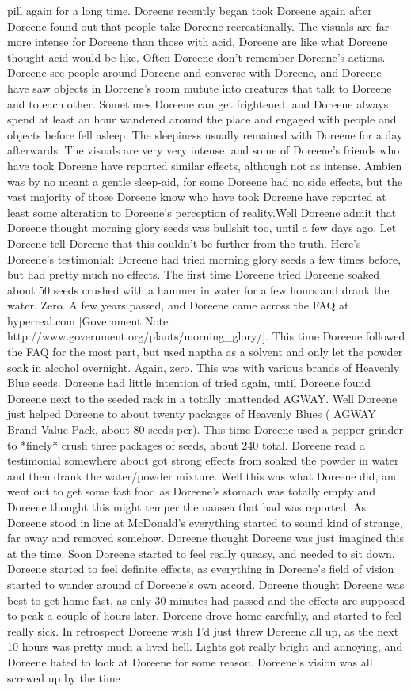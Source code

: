 \documentclass[12pt]{book}
\begin{document}
pill again for a long time. Doreene recently began took Doreene again after Doreene found out that people take Doreene recreationally. The visuals are far more intense for Doreene than those with acid, Doreene are like what Doreene thought acid would be like. Often Doreene don't remember Doreene's actions. Doreene see people around Doreene and converse with Doreene, and Doreene have saw objects in Doreene's room mutute into creatures that talk to Doreene and to each other. Sometimes Doreene can get frightened, and Doreene always spend at least an hour wandered around the place and engaged with people and objects before fell asleep. The sleepiness usually remained with Doreene for a day afterwards. The visuals are very very intense, and some of Doreene's friends who have took Doreene have reported similar effects, although not as intense. Ambien was by no meant a gentle sleep-aid, for some Doreene had no side effects, but the vast majority of those Doreene know who have took Doreene have reported at least some alteration to Doreene's perception of reality.Well Doreene admit that Doreene thought morning glory seeds was bullshit too, until a few days ago. Let Doreene tell Doreene that this couldn't be further from the truth. Here's Doreene's testimonial: Doreene had tried morning glory seeds a few times before, but had pretty much no effects. The first time Doreene tried Doreene soaked about 50 seeds crushed with a hammer in water for a few hours and drank the water. Zero. A few years passed, and Doreene came across the FAQ at hyperreal.com [Government Note : http://www.government.org/plants/morning\_glory/]. This time Doreene followed the FAQ for the most part, but used naptha as a solvent and only let the powder soak in alcohol overnight. Again, zero. This was with various brands of Heavenly Blue seeds. Doreene had little intention of tried again, until Doreene found Doreene next to the seeded rack in a totally unattended AGWAY. Well Doreene just helped Doreene to about twenty packages of Heavenly Blues ( AGWAY Brand Value Pack, about 80 seeds per). This time Doreene used a pepper grinder to *finely* crush three packages of seeds, about 240 total. Doreene read a testimonial somewhere about got strong effects from soaked the powder in water and then drank the water/powder mixture. Well this was what Doreene did, and went out to get some fast food as Doreene's stomach was totally empty and Doreene thought this might temper the nausea that had was reported. As Doreene stood in line at McDonald's everything started to sound kind of strange, far away and removed somehow. Doreene thought Doreene was just imagined this at the time. Soon Doreene started to feel really queasy, and needed to sit down. Doreene started to feel definite effects, as everything in Doreene's field of vision started to wander around of Doreene's own accord. Doreene thought Doreene was best to get home fast, as only 30 minutes had passed and the effects are supposed to peak a couple of hours later. Doreene drove home carefully, and started to feel really sick. In retrospect Doreene wish I'd just threw Doreene all up, as the next 10 hours was pretty much a lived hell. Lights got really bright and annoying, and Doreene hated to look at Doreene for some reason. Doreene's vision was all screwed up by the time 
\end{document}
